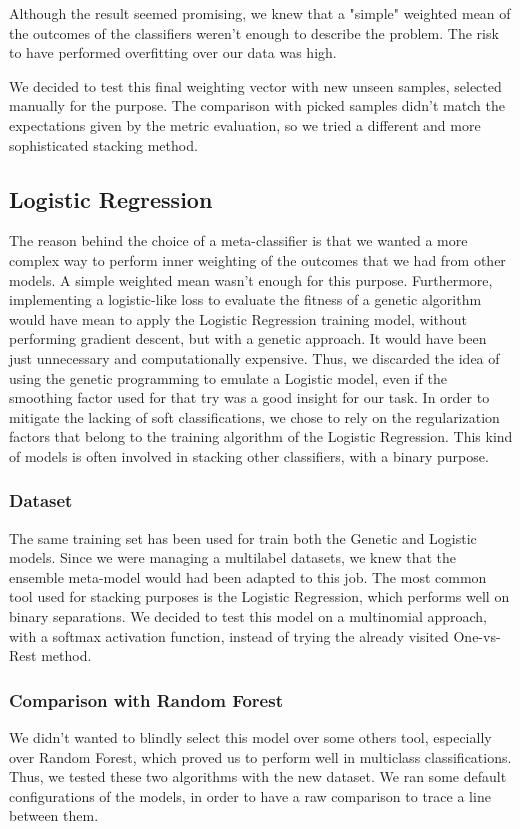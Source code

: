 Although the result seemed promising, we knew that a "simple" weighted mean of the outcomes of the classifiers weren't enough to describe the problem. The risk to have performed overfitting over our data was high.

We decided to test this final weighting vector with new unseen samples, selected manually for the purpose.
The comparison with picked samples didn't match the expectations given by the metric evaluation, so we tried a different and more sophisticated stacking method.

\subsection{Logistic Regression}
The reason behind the choice of a meta-classifier is that we wanted a more complex way to perform inner weighting of the outcomes that we had from other models.
A simple weighted mean wasn't enough for this purpose. Furthermore, implementing a logistic-like loss to evaluate the fitness of a genetic algorithm would have mean to apply the Logistic Regression training model, without performing gradient descent, but with a genetic approach. It would have been just unnecessary and computationally expensive.
Thus, we discarded the idea of using the genetic programming to emulate a Logistic model, even if the smoothing factor used for that try was a good insight for our task.
In order to mitigate the lacking of soft classifications, we chose to rely on the regularization factors that belong to the training algorithm of the Logistic Regression.
This kind of models is often involved in stacking other classifiers, with a binary purpose.

\subsubsection{Dataset}
The same training set has been used for train both the Genetic and Logistic models.
Since we were managing a multilabel datasets, we knew that the ensemble meta-model would had been adapted to this job. The most common tool used for stacking purposes is the Logistic Regression, which performs well on binary separations. We decided to test this model on a multinomial approach, with a softmax activation function, instead of trying the already visited One-vs-Rest method.

\subsubsection{Comparison with Random Forest}
We didn't wanted to blindly select this model over some others tool, especially over Random Forest, which proved us to perform well in multiclass classifications.
Thus, we tested these two algorithms with the new dataset.
We ran some default configurations of the models, in order to have a raw comparison to trace a line between them.

